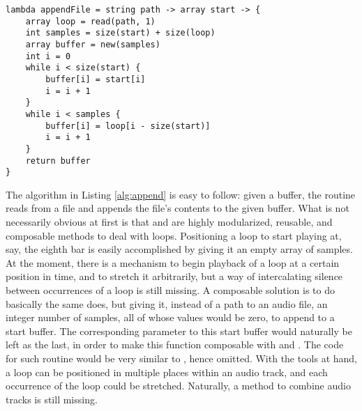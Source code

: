\begin{lstlisting}[emph={lambda,string,array,read,int,size,new,while,return},emphstyle={\textbf},caption={Appending the contents of a file to a given buffer.},label={alg:append}]
lambda appendFile = string path -> array start -> {
	array loop = read(path, 1)
	int samples = size(start) + size(loop)
	array buffer = new(samples)
	int i = 0
	while i < size(start) {
		buffer[i] = start[i]
		i = i + 1
	}
	while i < samples {
		buffer[i] = loop[i - size(start)]
		i = i + 1
	}
	return buffer
}
\end{lstlisting}

The algorithm in Listing \ref{alg:append} is easy to follow: given a  buffer, the routine reads from a file and appends the file's contents to the given buffer. What is not necessarily obvious at first is that  and  are highly modularized, reusable, and composable methods to deal with loops. Positioning a loop to start playing at, say, the eighth bar is easily accomplished by giving it an empty array of  samples. At the moment, there is a mechanism to begin playback of a loop at a certain position in time, and to stretch it arbitrarily, but a way of intercalating silence between occurrences of a loop is still missing. A composable solution is to do basically the same  does, but giving it, instead of a path to an audio file, an integer number of samples, all of whose values would be zero, to append to a start buffer. The corresponding parameter to this start buffer would naturally be left as the last, in order to make this function composable with  and . The code for such  routine would be very similar to , hence omitted. With the tools at hand, a loop can be positioned in multiple places within an audio track, and each occurrence of the loop could be stretched. Naturally, a method to combine audio tracks is still missing.

